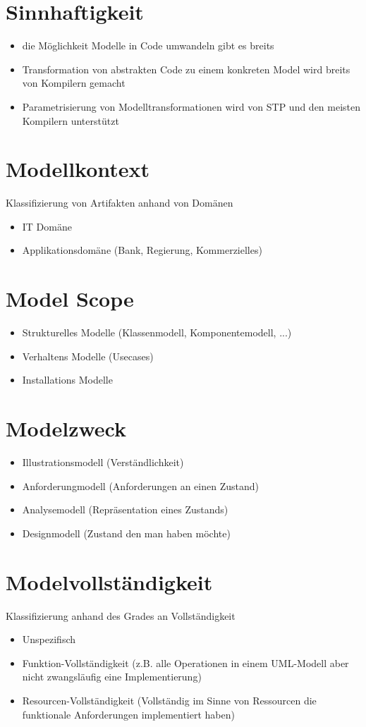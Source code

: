 \section{Sinnhaftigkeit}
\begin{itemize}
\item die Möglichkeit Modelle in Code umwandeln gibt es breits
\item Transformation von abstrakten Code zu einem konkreten Model wird breits von Kompilern gemacht
\item Parametrisierung von Modelltransformationen wird von STP und den meisten Kompilern unterstützt
\end{itemize}

\section{Modellkontext}
Klassifizierung von Artifakten anhand von Domänen
\begin{itemize}
\item IT Domäne
\item Applikationsdomäne (Bank, Regierung, Kommerzielles)
\end{itemize}

\section{Model Scope}
\begin{itemize}
\item Strukturelles Modelle (Klassenmodell, Komponentemodell, ...)
\item Verhaltens Modelle (Usecases)
\item Installations Modelle
\end{itemize}

\section{Modelzweck}
\begin{itemize}
\item Illustrationsmodell (Verständlichkeit)
\item Anforderungmodell (Anforderungen an einen Zustand)
\item Analysemodell (Repräsentation eines Zustands)
\item Designmodell (Zustand den man haben möchte) 
\end{itemize}

\section{Modelvollständigkeit}
Klassifizierung anhand des Grades an Vollständigkeit
\begin{itemize}
\item Unspezifisch
\item Funktion-Vollständigkeit (z.B. alle Operationen in einem UML-Modell aber nicht zwangsläufig eine Implementierung)
\item Resourcen-Vollständigkeit (Vollständig im Sinne von Ressourcen die funktionale Anforderungen implementiert haben)
\end{itemize}

